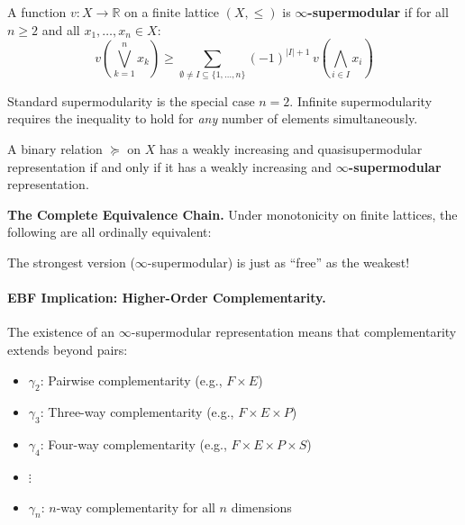 \begin{definition}
\label{def:inf-supermodular}
A function $v : X \to \mathbb{R}$ on a finite lattice $(X, \leq)$ is 
\textbf{$\infty$-supermodular} if for all $n \geq 2$ and all $x_1, \ldots, x_n \in X$:
\begin{equation}
v\left(\bigvee_{k=1}^{n} x_k\right) \geq 
\sum_{\emptyset \neq I \subseteq \{1,\ldots,n\}} (-1)^{|I|+1} \, 
v\left(\bigwedge_{i \in I} x_i\right)
\end{equation}
\end{definition}

Standard supermodularity is the special case $n = 2$. Infinite supermodularity 
requires the inequality to hold for \emph{any} number of elements simultaneously.

\begin{theorem}
\label{thm:inf-supermodular}
A binary relation $\succeq$ on $X$ has a weakly increasing and quasisupermodular 
representation if and only if it has a weakly increasing and 
\textbf{$\infty$-supermodular} representation.
\end{theorem}

\textbf{The Complete Equivalence Chain.}
Under monotonicity on finite lattices, the following are all ordinally equivalent:

\begin{center}
\end{center}

The strongest version ($\infty$-supermodular) is just as ``free'' as the weakest!

\paragraph{EBF Implication: Higher-Order Complementarity.}
The existence of an $\infty$-supermodular representation means that 
complementarity extends beyond pairs:

\begin{itemize}
    \item $\gamma_2$: Pairwise complementarity (e.g., $F \times E$)
    \item $\gamma_3$: Three-way complementarity (e.g., $F \times E \times P$)
    \item $\gamma_4$: Four-way complementarity (e.g., $F \times E \times P \times S$)
    \item $\vdots$
    \item $\gamma_n$: $n$-way complementarity for all $n$ dimensions
\end{itemize}

